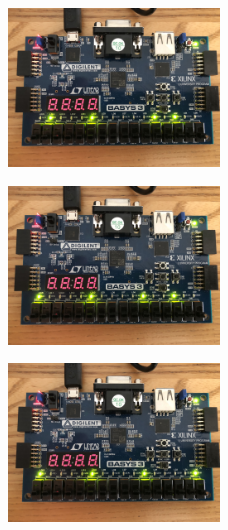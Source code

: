 \documentclass[11pt]{article}
\begin{document}
\begin{figure}[H]
\begin{center}
	\includegraphics[width=0.5\textwidth]{./images/Part1/l9p1img2.jpg}
	\caption{\label{fig:part1_img2}}
\end{center}
\end{figure}

\begin{figure}[H]
\begin{center}
	\includegraphics[width=0.5\textwidth]{./images/Part1/l9p1img3.jpg}
	\caption{\label{fig:part1_img3}}
\end{center}
\end{figure}

\begin{figure}[H]
\begin{center}
	\includegraphics[width=0.5\textwidth]{./images/Part1/l9p1img4.jpg}
	\caption{\label{fig:part1_img4}}
\end{center}
\end{figure}
\end{document}
